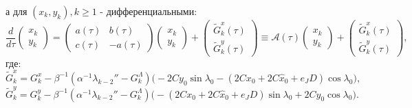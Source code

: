 а для $(x_k,y_k), k \ge 1$ - дифференциальными:
\begin{equation}
\frac{d}{d\tau} \begin{pmatrix} x_k \\ y_k \end{pmatrix} = \begin{pmatrix} a(\tau) & b(\tau)\\ c(\tau) & -a(\tau) \end{pmatrix} \begin{pmatrix} x_k \\ y_k \end{pmatrix} + \begin{pmatrix} \tilde G_k^x(\tau) \\ \tilde G_k^y(\tau) \end{pmatrix} \equiv \mathcal{A}(\tau) \begin{pmatrix} x_k \\ y_k \end{pmatrix} + \begin{pmatrix} \tilde G_k^x(\tau) \\ \tilde G_k^y(\tau) \end{pmatrix},
\label{xy_eq}
\end{equation}
где:
$$ \tilde G_k^x = G_k^x - \beta^{-1} (\alpha^{-1} \lambda_{k-2}'' - G_k^\Lambda) \big( -2Cy_0 \sin\lambda_0 - (2Cx_0+2C \hat x_0+e_JD) \cos\lambda_0 \big), $$
$$ \tilde G_k^y = G_k^y - \beta^{-1} (\alpha^{-1} \lambda_{k-2}'' - G_k^\Lambda) \big( -(2Cx_0+2C \hat x_0+e_JD) \sin\lambda_0 + 2Cy_0 \cos\lambda_0 \big). $$


